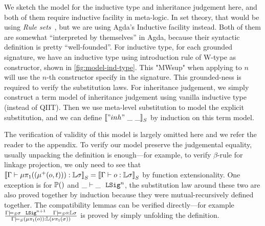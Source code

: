 We sketch the model for the inductive type and inheritance judgement here, and both of them require inductive facility in meta-logic. In set theory, that would be using \textit{Rule sets}~\cite{timany2017consistency,aczel1998relating}, but we are using Agda's Inductive facility instead. Both of them are somewhat ``interpreted by themselves'' in Agda, because their syntactic definition is pretty ``well-founded''. For inductive type, for each grounded signature, we have an inductive type using introduction rule of W-type as constructor, shown in \cref{fig:model-ind-type}. This "MWsup" when applying to $n$ will use the $n$-th constructor specify in the signature. This grounded-ness is required to verify the substitution laws. For inheritance judgement, we simply construct a term model of inheritance judgement using vanilla inductive type (instead of QIIT). Then we use meta-level substitution to model the explicit substitution, and we can define ${\llbracket {"inh"~\_ ~\_} \rrbracket}_S$ by induction on this term model. 



The verification of validity of this model is largely omitted here and we refer the reader to the appendix. To verify our model preserve the judgemental equality, usually unpacking the definition is enough---for example, to verify $\beta$-rule for linkage projection, we only need to see that ${\llbracket {\ensuremath{ {\Gamma} \vdash {\ensuremath{\mu\pi_{\texttt{1}}({(\mu^+({o},{t}))})}} : {\mathbb{L}\sigma} }} \rrbracket}_S = {\llbracket {\ensuremath{ {\Gamma} \vdash {o} : {\mathbb{L}\sigma} }} \rrbracket}_S$ by function extensionality. One exception is for $\mathbb{P}({})$ and $ {\_} \vdash {\_} \ \ \texttt{LSig}^{n} $, the substitution law around these two are also proved together by induction because they were mutual-recursively defined together. The compatibility lemmas can be verified directly---for example $\frac{{ {\Gamma} \models_S {\sigma} \ \ \texttt{LSig}^{n+1} }\quad{ {\ensuremath{\Gamma}} \models_S {o} : {\ensuremath{\mathbb{L}}\sigma} }}{{ {\Gamma} \models_S {(\mu\pi_{\texttt{1}}({o}))} : {\mathbb{L}(\nu\pi_{\texttt{1}}({\sigma}))} }}$ is proved by simply unfolding the definition.


